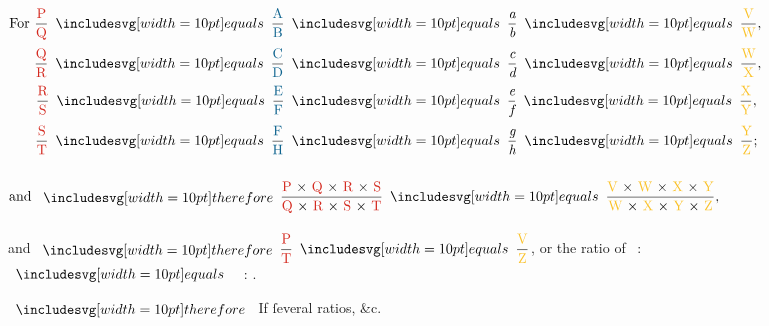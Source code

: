 \documentclass[11pt,preview]{standalone}
\begin{document}
\begin{center}
    $\begin{aligned} \text{For } \dfrac{\text{\redP}}{\text{\redQ}} \bequals \dfrac{\text{\blueA}}{\text{\blueB}} & \bequals \dfrac{\textit{a}}{\textit{b}}                                                                                    \bequals \dfrac{\text{\yellowV}}{\text{\yellowW}}, \\[0.5ex]
                \dfrac{\text{\redQ}}{\text{\redR}} \bequals \dfrac{\text{\blueC}}{\text{\blueD}}             & \bequals \dfrac{\textit{c}}{\textit{d}}               \bequals \dfrac{\text{\yellowW}}{\text{\yellowX}},                                                                      \\[0.5ex]
                \dfrac{\text{\redR}}{\text{\redS}} \bequals \dfrac{\text{\blueE}}{\text{\blueF}}             & \bequals \dfrac{\textit{e}}{\textit{f}}              \bequals \dfrac{\text{\yellowX}}{\text{\yellowY}},                                                                       \\[0.5ex]
                \dfrac{\text{\redS}}{\text{\redT}} \bequals \dfrac{\text{\blueF}}{\text{\blueH}}             & \bequals \dfrac{\textit{g}}{\textit{h}}              \bequals \dfrac{\text{\yellowY}}{\text{\yellowZ}};                                                                       \\[0.5ex]
                \hfill\end{aligned}$\\
    $\begin{aligned}
            \text{and }\btherefore \dfrac{\text{\redP\ × \redQ\ × \redR\ × \redS}}{\text{\redQ\ × \redR\ × \redS\ × \redT}} & \bequals \dfrac{\text{\yellowV\ × \yellowW\ × \yellowX\ × \yellowY}}{\text{\yellowW\ × \yellowX\ × \yellowY\ × \yellowZ}},\end{aligned}$\\
    \hfill\\
    and $\btherefore \dfrac{\text{\redP}}{\text{\redT}} \bequals \dfrac{\text{\yellowV}}{\text{\yellowZ}}$, or the ratio of \redP\ : \redT\ $\bequals$ \yellowV\ : \yellowZ.
\end{center}

\hfill

$\btherefore$ If ſeveral ratios, \&c.
\end{document}

